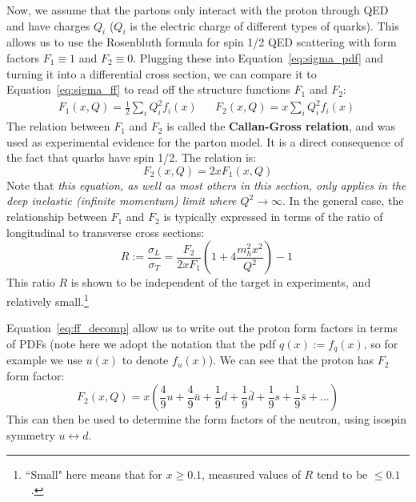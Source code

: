 \documentclass[11pt, oneside]{article}   	%
\theoremstyle{definition}
\begin{document}
Now, we assume that the partons only interact with the proton through QED and have charges $Q_i$ ($Q_i$ is the electric 
charge of different types of quarks). This allows us to use the Rosenbluth formula for spin 1/2 QED scattering with form factors 
$F_1\equiv 1$ and $F_2\equiv 0$. Plugging these into Equation~\ref{eq:sigma_pdf} and turning it into a differential cross 
section, we can compare it to Equation~\ref{eq:sigma_ff} to read off the structure functions $F_1$ and $F_2$:
\begin{align}
	F_1(x, Q) = \frac{1}{2}\sum_i Q_i^2 f_i(x) && F_2(x, Q) = x\sum_i Q_i^2 f_i(x)~
	\label{eq:ff_decomp}
\end{align}
The relation between $F_1$ and $F_2$ is called the \textbf{Callan-Gross relation}, and was used as experimental evidence for 
the parton model. It is a direct consequence of the fact that quarks have spin 1/2. The relation is:
\begin{equation}
	F_2(x, Q) = 2x F_1(x, Q)
\end{equation}
Note that \textit{this equation, as well as most others in this section, only applies in the deep inelastic (infinite momentum) limit where 
$Q^2\rightarrow\infty$}. In the general case, the relationship between $F_1$ and $F_2$ is typically expressed in terms of the ratio of 
longitudinal to transverse cross sections:
\begin{equation}
	R := \frac{\sigma_L}{\sigma_T} = \frac{F_2}{2x F_1}\left(1 + 4 \frac{m_h^2x^2}{Q^2}\right) - 1~
	\label{eq:R_F2}
\end{equation}
This ratio $R$ is shown to be independent of the target in experiments, and relatively small.\footnote{``Small" here means that for $x \geq
0.1$, measured values of $R$ tend to be $\leq 0.1$~\cite{nuclear_emc}.} 

Equation~\ref{eq:ff_decomp} allow us to write out the proton form factors in terms of PDFs (note here we adopt the notation that the pdf 
$q(x) := f_q(x)$, so for example we use $u(x)$ to denote $f_u(x)$). We can see that the proton has $F_2$ form factor:
\begin{equation}
	F_2(x, Q) = x\left(\frac{4}{9} u + \frac{4}{9}\bar u + \frac{1}{9} d + \frac{1}{9}\bar d+ \frac{1}{9} s + \frac{1}{9}\bar s + ...\right)
\end{equation}
This can then be used to determine the form factors of the neutron, using isospin symmetry $u\leftrightarrow d$. 
\end{document}
